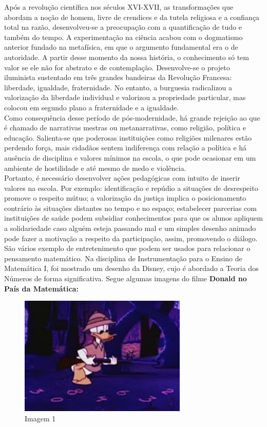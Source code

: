 \documentclass[a4paper, 12pt]{article}
\begin{document}
Após a revolução científica nos séculos XVI-XVII, as transformações que abordam a noção de homem, livre de crendices e da tutela religiosa e a confiança total na razão, desenvolveu-se a preocupação com a quantificação de tudo e também do tempo. A experimentação na ciência acabou com o dogmatismo anterior fundado na metafísica, em que o argumento fundamental era o de autoridade. A partir desse momento da nossa história, o conhecimento só tem valor se ele não for abstrato e de contemplação. Desenvolve-se o projeto iluminista sustentado em três grandes bandeiras da Revolução Francesa: liberdade, igualdade, fraternidade. No entanto, a burguesia radicalizou a valorização da liberdade individual e valorizou a propriedade particular, mas colocou em segundo plano a fraternidade e a igualdade.\\
Como consequência desse período de pós-modernidade, há grande rejeição ao que é chamado de narrativas mestras ou metanarrativas, como religião, política e educação. Salienta-se que poderosas instituições como religiões milenares estão perdendo força, mais cidadãos sentem indiferença com relação a política e há ausência de disciplina e valores mínimos na escola, o que pode ocasionar em um ambiente de hostilidade e até mesmo de medo e violência.\\
Portanto, é necessário desenvolver ações pedagógicas com intuito de inserir valores na escola. Por exemplo: identificação e repúdio a situações de desrespeito promove o respeito mútuo; a valorização da justiça implica o posicionamento contrário às situações distantes no tempo e no espaço; estabelecer parcerias com instituições de saúde podem subsidiar conhecimentos para que os alunos apliquem a solidariedade caso alguém esteja passando mal e um simples desenho animado pode fazer a motivação a respeito da participação, assim, promovendo o diálogo.\\
São vários exemplo de entretenimento que podem ser usados para relacionar o pensamento matemático. Na disciplina de Instrumentação para o Ensino de Matemática I, foi mostrado um desenho da Disney, cujo é abordado a Teoria dos Números de forma significativa. Segue algumas imagens do filme \textbf{Donald no País da Matemática:}
  \begin{figure}[ht!]
    \centering
    \includegraphics[width=80mm]{img1.png}
    \caption{Imagem 1}
  \end{figure}
\end{document}
